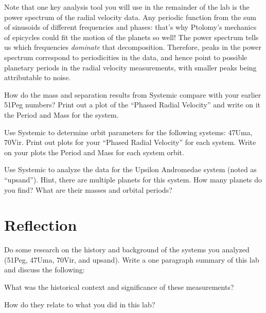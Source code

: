 Note that one key analysis tool you will use in the remainder of the lab is the power spectrum of the radial velocity data. Any periodic function from the sum of sinusoids of different frequencies and phases: that's why Ptolomy's mechanics of epicycles could fit the motion of the planets so well! The power spectrum tells us which frequencies {\itshape dominate} that decomposition. Therefore, peaks in the power spectrum correspond to periodicities in the data, and hence point to possible planetary periods in the radial velocity measurements, with smaller peaks being attributable to noise.

\begin{steps}
	\item How do the mass and separation results from Systemic compare with your earlier 51Peg numbers? Print out a plot of the ``Phased Radial Velocity'' and write on it the Period and Mass for the system.
	
	\item Use Systemic to determine orbit parameters for the following systems: 47Uma, 70Vir. Print out plots for your ``Phased Radial Velocity'' for each system. Write on your plots the Period and Mass for each system orbit.
	
	\item Use Systemic to analyze the data for the Upsilon Andromedae system (noted as ``upsand''). Hint, there are multiple planets for this system. How many planets do you find? What are their masses and orbital periods?
	
\end{steps}

\section{Reflection}

Do some research on the history and background of the systems you analyzed (51Peg, 47Uma, 70Vir, and upsand). Write a one paragraph summary of this lab and discuss the following:

\begin{steps}
	\item What was the historical context and significance of these measurements?
	
	\item How do they relate to what you did in this lab?
\end{steps}

